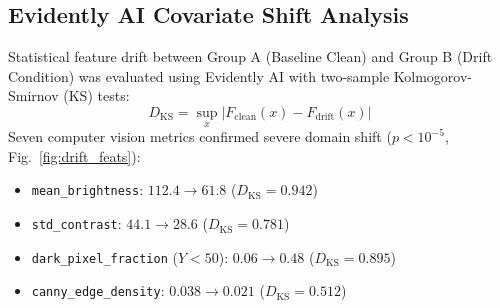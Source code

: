 \documentclass[10pt,journal,compsoc]{IEEEtran}
\begin{document}
\begin{table}[t]
\caption{Comprehensive Resilience and Closed-Loop Performance Comparison Under Photometric Drift}
\label{tab:resilience}
\centering
{}
\end{table}

\subsection{Evidently AI Covariate Shift Analysis}
Statistical feature drift between Group A (Baseline Clean) and Group B (Drift Condition) was evaluated using Evidently AI with two-sample Kolmogorov-Smirnov (KS) tests:
\begin{equation}
D_{\text{KS}} = \sup_{x} |F_{\text{clean}}(x) - F_{\text{drift}}(x)|
\end{equation}
Seven computer vision metrics confirmed severe domain shift ($p < 10^{-5}$, Fig.~\ref{fig:drift_feats}):
\begin{itemize}
    \item \texttt{mean\_brightness}: $112.4 \to 61.8$ ($D_{\text{KS}} = 0.942$)
    \item \texttt{std\_contrast}: $44.1 \to 28.6$ ($D_{\text{KS}} = 0.781$)
    \item \texttt{dark\_pixel\_fraction} ($Y < 50$): $0.06 \to 0.48$ ($D_{\text{KS}} = 0.895$)
    \item \texttt{canny\_edge\_density}: $0.038 \to 0.021$ ($D_{\text{KS}} = 0.512$)
\end{itemize}
\end{document}

